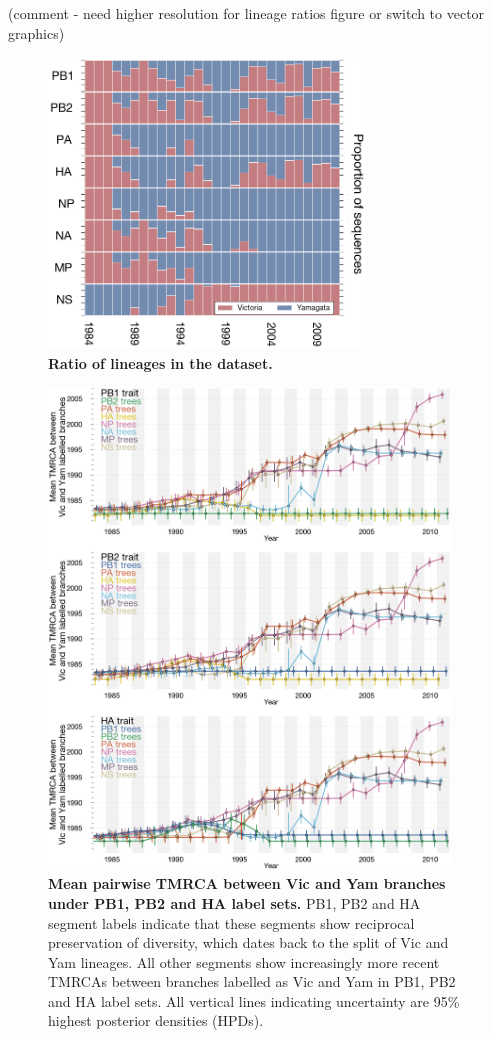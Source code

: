 \documentclass[11pt,oneside,letterpaper]{article}
\begin{document}
(comment - need higher resolution for lineage ratios figure or switch to vector graphics)
\begin{figure}[h]
	\centering	
	\includegraphics[width=0.75\textwidth]	{figures/InfB_LineageRatiosOverTime.png}
	\caption{\textbf{Ratio of lineages in the dataset.}}
	\label{lineageRatiosOverTime}
\end{figure}

\begin{figure}
	\centering		
	\includegraphics[width=0.95\textwidth]{figures/InfB_betweenDiversity.png}
	\caption{\textbf{Mean pairwise TMRCA between Vic and Yam branches under PB1, PB2 and HA label sets.}
PB1, PB2 and HA segment labels indicate that these segments show reciprocal preservation of diversity, which dates back to the split of Vic and Yam lineages.
All other segments show increasingly more recent TMRCAs between branches labelled as Vic and Yam in PB1, PB2 and HA label sets.
All vertical lines indicating uncertainty are 95\% highest posterior densities (HPDs).}
	\label{betweenDiversity}
\end{figure}
\end{document}
